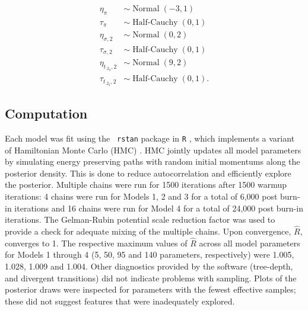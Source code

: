 \documentclass[aoas]{imsart}
\newcommand{\op}{\operatorname}
\begin{document}
\begin{align*}
  \eta_{\pi} & \sim \op{Normal}(-3, 1)\\
  \tau_{\pi} & \sim \op{Half-Cauchy}(0, 1)\\
  \eta_{\sigma ,2} & \sim \op{Normal}(0, 2)\\
  \tau_{\sigma ,2} & \sim \op{Half-Cauchy}(0, 1)\\
  \eta_{t_{.2_2},2} & \sim \op{Normal}(9, 2)\\
  \tau_{t_{.2_2},2} & \sim \op{Half-Cauchy}(0, 1).
 \end{align*} 

\subsection{Computation}
\label{sec:Computation}
Each model was fit using the {\tt
  rstan} \citep{rstan} package in {\tt R} \citep{r}, which implements a variant of Hamiltonian Monte Carlo (HMC)
\citep{betancourt}. HMC jointly updates all model parameters by simulating energy preserving paths with random initial momentums along the posterior density. This is done to reduce autocorrelation and efficiently explore the posterior. Multiple chains were run for 1500 iterations after 1500 warmup iterations: 4 chains were run for Models 1, 2 and 3 for a total of 6,000 post burn-in iterations and 16 chains were run for Model 4 for a total of 24,000 post burn-in iterations. The Gelman-Rubin potential scale reduction factor was used to provide a check for adequate mixing of the multiple chains. Upon convergence, $\hat{R}$, converges to 1.  The  respective maximum values of $\hat{R}$ across all model parameters for Models 1 through 4 (5, 50, 95 and 140 parameters, respectively) were 1.005, 1.028, 1.009 and 1.004. Other diagnostics provided by the software (tree-depth, and divergent transitions) did not indicate problems with sampling. Plots of the posterior draws were inspected for parameters with the fewest effective samples; these did not suggest features that were inadequately explored.

\end{document}
